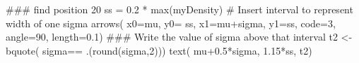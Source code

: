 \begin{Schunk}
\begin{Sinput}
 ### find position 20% "up" vertically, to use for arrow coordinate
 ss = 0.2 * max(myDensity)
 # Insert interval to represent width of one sigma
 arrows( x0=mu, y0= ss, x1=mu+sigma, y1=ss, code=3, angle=90, length=0.1)
 ### Write the value of sigma above that interval
 t2 <-  bquote( sigma== .(round(sigma,2)))
 text( mu+0.5*sigma, 1.15*ss, t2)
\end{Sinput}
\end{Schunk}
